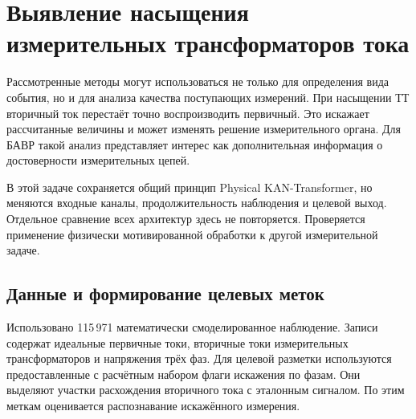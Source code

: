 \section{Выявление насыщения измерительных трансформаторов тока}
\label{sec:ch4_ct_saturation}

Рассмотренные методы могут использоваться не только
для определения вида события, но и для анализа
качества поступающих измерений. При насыщении ТТ
вторичный ток перестаёт точно воспроизводить первичный.
Это искажает рассчитанные величины и может изменять
решение измерительного органа.
Для БАВР такой анализ представляет интерес
как дополнительная информация о достоверности
измерительных цепей.

В этой задаче сохраняется общий принцип Physical KAN-Transformer,
но меняются входные каналы, продолжительность наблюдения
и целевой выход. Отдельное сравнение всех архитектур
здесь не повторяется. Проверяется применение
физически мотивированной обработки к другой
измерительной задаче.

\subsection{Данные и формирование целевых меток}
\label{sec:ch4_ct_targets}

Использовано 115\,971 математически смоделированное
наблюдение. Записи содержат идеальные первичные токи,
вторичные токи измерительных трансформаторов
и напряжения трёх фаз. Для целевой разметки используются предоставленные
с расчётным набором флаги искажения по фазам.
Они выделяют участки расхождения вторичного тока
с эталонным сигналом. По этим меткам оценивается
распознавание искажённого измерения.

